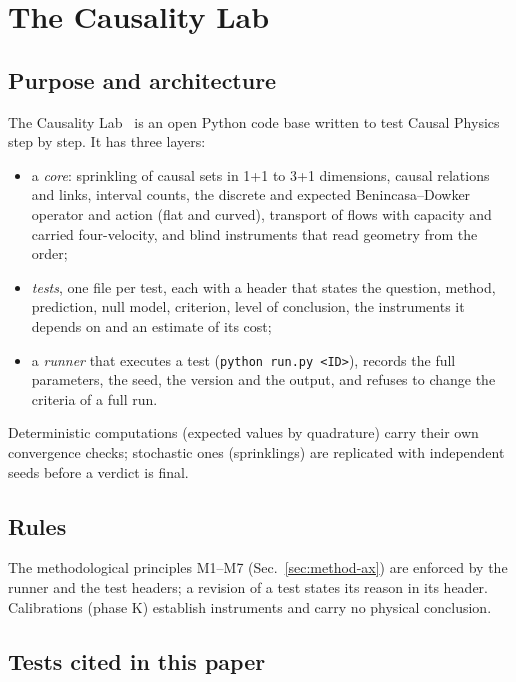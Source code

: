 \section{The Causality Lab}\label{app:lab}

\subsection{Purpose and architecture}

The Causality Lab~\cite{CausalityLab} is an open Python code base written to test Causal Physics step by
step. It has three layers:
\begin{itemize}
\item a \emph{core}: sprinkling of causal sets in 1+1 to 3+1 dimensions, causal relations and links,
  interval counts, the discrete and expected Benincasa--Dowker operator and action (flat and curved),
  transport of flows with capacity and carried four-velocity, and blind instruments that read geometry
  from the order;
\item \emph{tests}, one file per test, each with a header that states the question, method, prediction,
  null model, criterion, level of conclusion, the instruments it depends on and an estimate of its cost;
\item a \emph{runner} that executes a test (\texttt{python run.py <ID>}), records the full parameters, the
  seed, the version and the output, and refuses to change the criteria of a full run.
\end{itemize}
Deterministic computations (expected values by quadrature) carry their own convergence checks; stochastic
ones (sprinklings) are replicated with independent seeds before a verdict is final.

\subsection{Rules}

The methodological principles M1--M7 (Sec.~\ref{sec:method-ax}) are enforced by the runner and the test
headers; a revision of a test states its reason in its header. Calibrations (phase K) establish
instruments and carry no physical conclusion.

\subsection{Tests cited in this paper}

